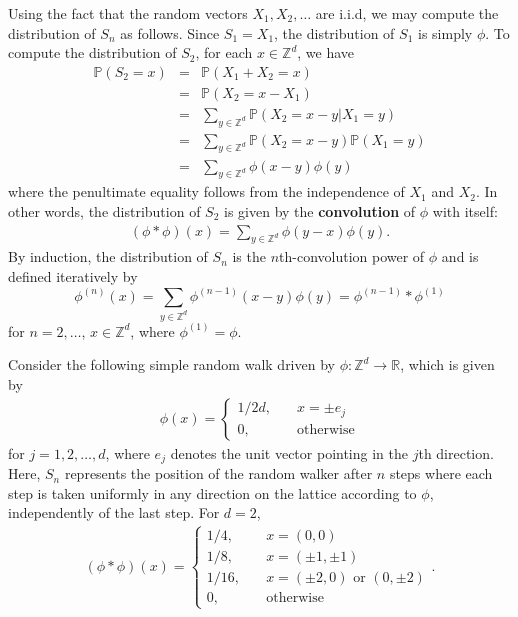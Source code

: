 \documentclass[11pt, letter]{book}
\newenvironment{example}
  {\pushQED{\qed}\renewcommand{\qedsymbol}{$\triangle$}\examplex}
  {\popQED\endexamplex}
\begin{document}
\noindent Using the fact that the random vectors $X_1,X_2,\dots$ are i.i.d, we may compute the distribution of $S_n$ as follows. Since $S_1 = X_1$, the distribution of $S_1$ is simply $\phi$. To compute the distribution of $S_2$, for each $x\in\mathbb{Z}^d$, we have
\begin{eqnarray*}
    \mathbb{P}(S_2=x)
    &=&\mathbb{P}(X_1+X_2=x)\\
    &=&\mathbb{P}(X_2=x-X_1)\\
    &=& \sum_{y\in\mathbb{Z}^d} \mathbb{P}(X_2 = x-y|X_1=y)\\
    &=& \sum_{y\in\mathbb{Z}^d} \mathbb{P}(X_2 = x-y)\mathbb{P}(X_1 = y)\\
    &=&\sum_{y\in\mathbb{Z}^d}\phi(x-y)\phi(y)
\end{eqnarray*}
where the penultimate equality follows from the independence of $X_1$ and $X_2$. In other words, the distribution of $S_2$ is given by the \textbf{convolution} of $\phi$ with itself:
\begin{align*}
    (\phi \ast \phi)(x) = \sum_{y\in \mathbb{Z}^d} \phi(y-x) \phi(y).
\end{align*}
By induction, the distribution of $S_n$ is the $n$th-convolution power of $\phi$ and is defined iteratively by
\begin{equation*}
    \phi^{(n)}(x)=\sum_{y\in\mathbb{Z}^d}\phi^{(n-1)}(x-y)\phi(y) = \phi^{(n-1)}\ast \phi^{(1)}
\end{equation*}
for $n=2,\dots$, $x\in\mathbb{Z}^d$, where $\phi^{(1)} = \phi$. 


\begin{example}\normalfont
Consider the following simple random walk driven by $\phi: \mathbb{Z}^d \to \mathbb{R}$, which is given by 
\begin{align*}
    \phi(x) = 
    \begin{cases}
    1/2d, &\quad x = \pm e_j\\
    0, &\quad \text{otherwise}
    \end{cases}
\end{align*}
for $j = 1,2,\dots, d$, where $e_j$ denotes the unit vector pointing in the $j$th direction. Here, $S_n$ represents the position of the random walker after $n$ steps where each step is taken uniformly in any direction on the lattice according to $\phi$, independently of the last step. For $d=2$, 
\begin{align*}
    (\phi\ast\phi) (x) = 
    \begin{cases}
    1/4, &\quad x = (0,0)\\ 
    1/8, &\quad x = (\pm 1, \pm 1)\\
    1/16, &\quad x = (\pm 2, 0) \mbox{ or } (0,\pm 2)\\
    0, &\quad \mbox{otherwise} 
    \end{cases}.
\end{align*}
\end{example}
\end{document}
